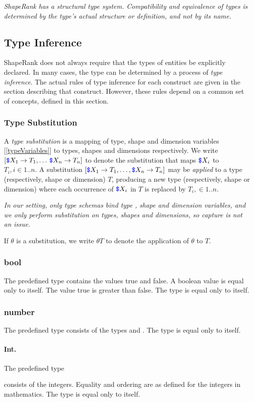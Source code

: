 \documentclass{article}
\begin{document}
{{\em 
ShapeRank has a structural type system. Compatibility and equivalence of types is determined by the type's actual structure or definition, and not by  its name.
}

 \subsection{Type Inference}
  \label{typeInference}
  
 ShapeRank does not always require that the types of entities be explicitly declared.  In many cases, the type can be determined by a process of {\em type inference}. The actual rules of type inference for each construct are given in the section describing that construct. However, these rules depend on a common set of concepts, defined in this section.
 
  
  \subsubsection{Type Substitution}
  \label{typeSubstitution}
  
  A {\em type substitution} is a mapping of type, shape and dimension variables [\ref{typeVariables}] to types, shapes and dimensions respectively. We write $[\texttt{\color{blue} \$}{}X_1 \to T_1, \ldots\, \texttt{\color{blue} \$}{}X_n \to T_n]$ to denote the substitution that maps $\texttt{\color{blue} \$}{}X_i$ to $T_i, i \in 1..n$. A substitution $[\texttt{\color{blue} \$}{}X_1 \to T_1, \ldots, \texttt{\color{blue} \$}{}X_n \to T_n]$ may be {\em applied} to a type (respectively, shape or dimension) $T$, producing a new type (respectively, shape or dimension) where each occurrence of $\texttt{\color{blue} \$}{}X_i$ in $T$ is replaced by $T_i ,\in 1..n$.
  
  {\em 
  In our setting, only type schemas bind type , shape and dimension variables, and we only perform substitution on types, shapes and dimensions, so capture is not an issue.
  }
  
If $\theta$ is a substitution, we write $\theta T$ to denote the application of $\theta$ to $T$.

\subsubsection{bool}
\label{bool}

The predefined type \BOOL{} contains the values true and false.  A boolean value is equal only to itself. The value true is greater than false. The type \BOOL{} is equal only to itself.

\subsubsection{number}
\label{number}

 The predefined type \NUMBER{} consists of the types \INT{} and \FLOAT. The type \NUMBER{} is equal only to itself. 
 
 \paragraph{Int.} The predefined type \INT} consists of the integers. Equality and ordering are as defined for the integers in mathematics. The type \INT{} is equal only to itself.
\end{document}
